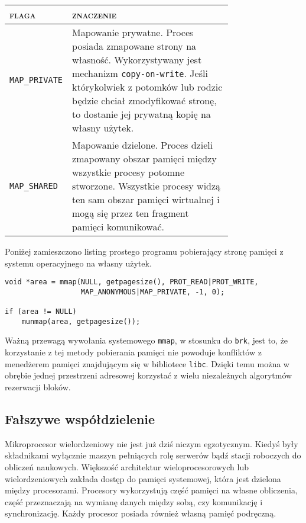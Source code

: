 \documentclass[12pt,a4paper,titlepage,twoside]{mwart}
\begin{document}
\begin{center}
\begin{tabular}{|l|p{0.75\linewidth}|}
\hline
\textsc{flaga} & \textsc{znaczenie} \\
\hline
\verb+MAP_PRIVATE+ & Mapowanie prywatne. Proces posiada zmapowane strony na
własność. Wykorzystywany jest mechanizm \texttt{copy-on-write}. Jeśli
którykolwiek z potomków lub rodzic będzie chciał zmodyfikować stronę, to
dostanie jej prywatną kopię na własny użytek. \\
\hline
\verb+MAP_SHARED+  & Mapowanie dzielone. Proces dzieli zmapowany obszar pamięci
między wszystkie procesy potomne stworzone. Wszystkie procesy widzą ten sam
obszar pamięci wirtualnej i mogą się przez ten fragment pamięci komunikować. \\
\hline
\end{tabular}
\end{center}

Poniżej zamieszczono listing prostego programu pobierający stronę pamięci z
systemu operacyjnego na własny użytek.

\vspace{2ex}
\begin{lstlisting}[caption={Przykład pobrania i zwolnienia jednej strony.},xleftmargin=3ex,xrightmargin=3ex]
void *area = mmap(NULL, getpagesize(), PROT_READ|PROT_WRITE,
                  MAP_ANONYMOUS|MAP_PRIVATE, -1, 0);

if (area != NULL)
    munmap(area, getpagesize());
\end{lstlisting}

Ważną przewagą wywołania systemowego \texttt{mmap}, w stosunku do \texttt{brk},
jest to, że korzystanie z tej metody pobierania pamięci nie powoduje konfliktów z
menedżerem pamięci znajdującym się w bibliotece \texttt{libc}. Dzięki temu
można w obrębie jednej przestrzeni adresowej korzystać z wielu niezależnych
algorytmów rezerwacji bloków.

\subsection{Fałszywe współdzielenie}

Mikroprocesor wielordzeniowy nie jest już dziś niczym egzotycznym. Kiedyś były
składnikami wyłącznie maszyn pełniących rolę serwerów bądź stacji roboczych do
obliczeń naukowych. Większość architektur wieloprocesorowych lub
wielordzeniowych zakłada dostęp do pamięci systemowej, która jest dzielona
między procesorami. Procesory wykorzystują część pamięci na własne obliczenia,
część przeznaczają na wymianę danych między sobą, czy komunikację i synchronizację.
Każdy procesor posiada również własną pamięć podręczną.
\end{document}
